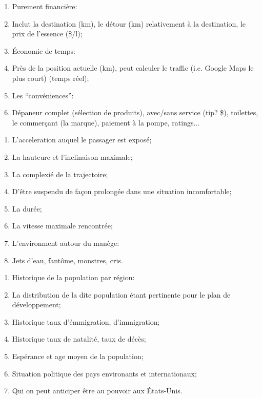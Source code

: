 \documentclass{amsart}
\begin{document}
\begin{enumerate}
    \item Purement financi\`ere:
    \item[] Inclut la destination (km), le d\'etour (km) relativement \`a la destination, le prix de l'essence (\$/l);
    \item \'Economie de temps:
    \item[] Pr\`es de la position actuelle (km), peut calculer le traffic (i.e. Google Maps le plus court) (temps r\'eel);
    \item Les ``conv\'eniences'':
    \item[] D\'epaneur complet (s\'election de produits), avec/sans service (tip? \$), toilettes, le commer\c cant (la marque), paiement \`a la pompe, ratings...
\end{enumerate}

\hrulefill

\begin{enumerate}
    \item L'acceleration auquel le passager est expos\'e;
    \item La hauteure et l'inclinaison maximale;
    \item La complexi\'e de la trajectoire;
    \item D'\^etre suspendu de fa\c con prolong\'ee dans une situation incomfortable;
    \item La dur\'ee;
    \item La vitesse maximale rencontr\'ee;
    \item L'environment autour du man\`ege:
    \item[] Jets d'eau, fant\^ome, monstres, cris.
\end{enumerate}

\hrulefill

\begin{enumerate}
    \item Historique de la population par r\'egion:
    \item[] La distribution de la dite population \'etant pertinente pour le plan de d\'eveloppement;
    \item Historique taux d'\'emmigration, d'immigration;
    \item Historique taux de natalit\'e, taux de d\'ec\`es;
    \item Esp\'erance et age moyen de la population;
    \item Situation politique des pays environants et internationaux;
    \item Qui on peut anticiper \^etre au pouvoir aux \'Etats-Unis.
\end{enumerate}
\end{document}
